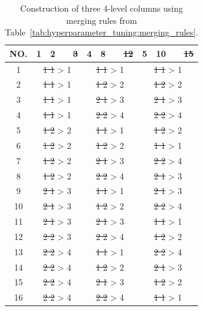 \begin{table}[ht]
	\centering
	\begin{tabular}{ |c||cccc|cccc|cccc|  }
		\hline
		NO.& 1 & 2 & & \sout{3} & 4 & 8 & &  \sout{12} & 5 & 10 & &  \sout{15}\\
		\hline
		1  & \multicolumn{4}{c}{\sout{1 1} > 1 } & \multicolumn{4}{|c|}{\sout{1 1} > 1 } & \multicolumn{4}{c|}{\sout{1 1} > 1 }\\
		2  & \multicolumn{4}{c}{\sout{1 1} > 1 } & \multicolumn{4}{|c|}{\sout{1 2} > 2 } & \multicolumn{4}{c|}{\sout{1 2} > 2 }\\
		3  & \multicolumn{4}{c}{\sout{1 1} > 1 } & \multicolumn{4}{|c|}{\sout{2 1} > 3 } & \multicolumn{4}{c|}{\sout{2 1} > 3 }\\
		4  & \multicolumn{4}{c}{\sout{1 1} > 1 } & \multicolumn{4}{|c|}{\sout{2 2} > 4 } & \multicolumn{4}{c|}{\sout{2 2} > 4 }\\
		5  & \multicolumn{4}{c}{\sout{1 2} > 2 } & \multicolumn{4}{|c|}{\sout{1 1} > 1 } & \multicolumn{4}{c|}{\sout{1 2} > 2 }\\
		6  & \multicolumn{4}{c}{\sout{1 2} > 2 } & \multicolumn{4}{|c|}{\sout{1 2} > 2 } & \multicolumn{4}{c|}{\sout{1 1} > 1 }\\
		7  & \multicolumn{4}{c}{\sout{1 2} > 2 } & \multicolumn{4}{|c|}{\sout{2 1} > 3 } & \multicolumn{4}{c|}{\sout{2 2} > 4 }\\
		8  & \multicolumn{4}{c}{\sout{1 2} > 2 } & \multicolumn{4}{|c|}{\sout{2 2} > 4 } & \multicolumn{4}{c|}{\sout{2 1} > 3 }\\
		9  & \multicolumn{4}{c}{\sout{2 1} > 3 } & \multicolumn{4}{|c|}{\sout{1 1} > 1 } & \multicolumn{4}{c|}{\sout{2 1} > 3 }\\
		10 & \multicolumn{4}{c}{\sout{2 1} > 3 } & \multicolumn{4}{|c|}{\sout{1 2} > 2 } & \multicolumn{4}{c|}{\sout{2 2} > 4 }\\
		11 & \multicolumn{4}{c}{\sout{2 1} > 3 } & \multicolumn{4}{|c|}{\sout{2 1} > 3 } & \multicolumn{4}{c|}{\sout{1 1} > 1 }\\
		12 & \multicolumn{4}{c}{\sout{2 2} > 3 } & \multicolumn{4}{|c|}{\sout{2 2} > 4 } & \multicolumn{4}{c|}{\sout{1 2} > 2 }\\
		13 & \multicolumn{4}{c}{\sout{2 2} > 4 } & \multicolumn{4}{|c|}{\sout{1 1} > 1 } & \multicolumn{4}{c|}{\sout{2 2} > 4 }\\
		14 & \multicolumn{4}{c}{\sout{2 2} > 4 } & \multicolumn{4}{|c|}{\sout{1 2} > 2 } & \multicolumn{4}{c|}{\sout{2 1} > 3 }\\
		15 & \multicolumn{4}{c}{\sout{2 2} > 4 } & \multicolumn{4}{|c|}{\sout{2 1} > 3 } & \multicolumn{4}{c|}{\sout{1 2} > 2 }\\
		16 & \multicolumn{4}{c}{\sout{2 2} > 4 } & \multicolumn{4}{|c|}{\sout{2 2} > 4 } & \multicolumn{4}{c|}{\sout{1 1} > 1 }\\
		\hline
	\end{tabular}
	\caption{Construction of three 4-level columns using merging rules from Table~\ref{tab:hyperparameter_tuning:merging_rules}.}
	\label{tab:hyperparameter_tuning:merging_columns}
\end{table}

